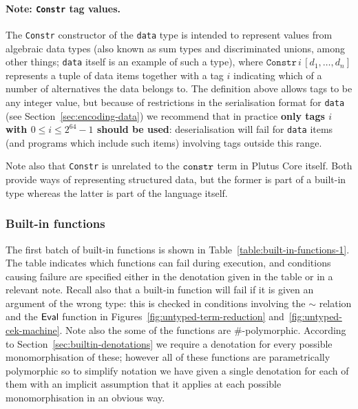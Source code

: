\paragraph{Note: \texttt{Constr} tag values.}
\label{note:constr-tag-values}
The \texttt{Constr} constructor of the \texttt{data} type is intended to
represent values from algebraic data types (also known as sum types and
discriminated unions, among other things; \texttt{data} itself is an example of
such a type), where $\mathtt{Constr}\, i\, [d_1,\ldots,d_n]$
represents a tuple of data items together with a tag $i$ indicating which of a
number of alternatives the data belongs to.  The definition above allows tags to
be any integer value, but because of restrictions in the serialisation format
for \texttt{data} (see Section~\ref{sec:encoding-data}) we recommend that in
practice \textbf{only tags $i$ with $0 \leq i \leq 2^{64}-1$ should be used}:
deserialisation will fail for \texttt{data} items (and programs which include
such items) involving tags outside this range.

Note also that \texttt{Constr} is unrelated to the $\texttt{constr}$ term in
Plutus Core itself. Both provide ways of representing structured data, but
the former is part of a built-in type whereas the latter is part of the language
itself.

\subsubsection{Built-in functions}
\label{sec:built-in-functions-1}
The first batch of built-in functions is shown in
Table~\ref{table:built-in-functions-1}.  The table indicates which
functions can fail during execution, and conditions causing failure are
specified either in the denotation given in the table or in a relevant note.
Recall also that a built-in function will fail if it is given an argument of the
wrong type: this is checked in conditions involving the $\sim$ relation and the
$\mathsf{Eval}$ function in Figures~\ref{fig:untyped-term-reduction}
and~\ref{fig:untyped-cek-machine}.  Note also the some of the functions are
\#-polymorphic.  According to Section~\ref{sec:builtin-denotations} we
require a denotation for every possible monomorphisation of these; however all
of these functions are parametrically polymorphic so to simplify notation we
have given a single denotation for each of them with an implicit assumption that
it applies at each possible monomorphisation in an obvious way.

